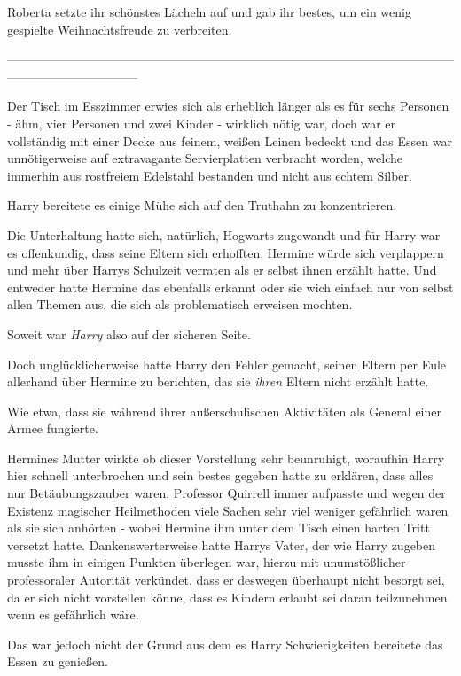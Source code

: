 {Roberta setzte ihr schönstes Lächeln auf und gab ihr bestes, um ein wenig gespielte Weihnachtsfreude zu verbreiten.

--------------------------------------------------------------------------------------------------------------------------------------------

Der Tisch im Esszimmer erwies sich als erheblich länger als es für sechs Personen - ähm, vier Personen und zwei Kinder - wirklich nötig war, doch war er vollständig mit einer Decke aus feinem, weißen Leinen bedeckt und das Essen war unnötigerweise auf extravagante Servierplatten verbracht worden, welche immerhin aus rostfreiem Edelstahl bestanden und nicht aus echtem Silber.

Harry bereitete es einige Mühe sich auf den Truthahn zu konzentrieren.

Die Unterhaltung hatte sich, natürlich, Hogwarts zugewandt und für Harry war es offenkundig, dass seine Eltern sich erhofften, Hermine würde sich verplappern und mehr über Harrys Schulzeit verraten als er selbst ihnen erzählt hatte. Und entweder hatte Hermine das ebenfalls erkannt oder sie wich einfach nur von selbst allen Themen aus, die sich als problematisch erweisen mochten.

Soweit war \emph{Harry} also auf der sicheren Seite.

Doch unglücklicherweise hatte Harry den Fehler gemacht, seinen Eltern per Eule allerhand über Hermine zu berichten, das sie \emph{ihren} Eltern nicht erzählt hatte.

Wie etwa, dass sie während ihrer außerschulischen Aktivitäten als General einer Armee fungierte.

Hermines Mutter wirkte ob dieser Vorstellung sehr beunruhigt, woraufhin Harry hier schnell unterbrochen und sein bestes gegeben hatte zu erklären, dass alles nur Betäubungszauber waren, Professor Quirrell immer aufpasste und wegen der Existenz magischer Heilmethoden viele Sachen sehr viel weniger gefährlich waren als sie sich anhörten - wobei Hermine ihm unter dem Tisch einen harten Tritt versetzt hatte. Dankenswerterweise hatte Harrys Vater, der wie Harry zugeben musste ihm in einigen Punkten überlegen war, hierzu mit unumstößlicher professoraler Autorität verkündet, dass er deswegen überhaupt nicht besorgt sei, da er sich nicht vorstellen könne, dass es Kindern erlaubt sei daran teilzunehmen wenn es gefährlich wäre.

Das war jedoch nicht der Grund aus dem es Harry Schwierigkeiten bereitete das Essen zu genießen.

}
